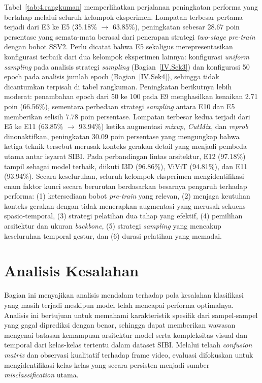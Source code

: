 Tabel~\ref{tab:4.rangkuman} memperlihatkan perjalanan peningkatan performa yang bertahap melalui seluruh kelompok eksperimen. Lompatan terbesar pertama terjadi dari E3 ke E5 (35.18\% $\rightarrow$ 63.85\%), peningkatan sebesar 28.67 poin persentase yang semata-mata berasal dari penerapan strategi \textit{two-stage pre-train} dengan bobot SSV2. Perlu dicatat bahwa E5 sekaligus merepresentasikan konfigurasi terbaik dari dua kelompok eksperimen lainnya: konfigurasi \textit{uniform sampling} pada analisis strategi \textit{sampling} (Bagian~\ref{IV.Sek3}) dan konfigurasi 50 epoch pada analisis jumlah epoch (Bagian~\ref{IV.Sek4}), sehingga tidak dicantumkan terpisah di tabel rangkuman. Peningkatan berikutnya lebih moderat: penambahan epoch dari 50 ke 100 pada E9 menghasilkan kenaikan 2.71 poin (66.56\%), sementara perbedaan strategi \textit{sampling} antara E10 dan E5 memberikan selisih 7.78 poin persentase. Lompatan terbesar kedua terjadi dari E5 ke E11 (63.85\% $\rightarrow$ 93.94\%) ketika augmentasi \textit{mixup}, \textit{CutMix}, dan \textit{reprob} dinonaktifkan, peningkatan 30.09 poin persentase yang mengungkap bahwa ketiga teknik tersebut merusak konteks gerakan detail yang menjadi pembeda utama antar isyarat SIBI. Pada perbandingan lintas arsitektur, E12 (97.18\%) tampil sebagai model terbaik, diikuti I3D (96.86\%), ViViT (94.81\%), dan E11 (93.94\%). Secara keseluruhan, seluruh kelompok eksperimen mengidentifikasi enam faktor kunci secara berurutan berdasarkan besarnya pengaruh terhadap performa: (1) ketersediaan bobot \textit{pre-train} yang relevan, (2) menjaga keutuhan konteks gerakan dengan tidak menerapkan augmentasi yang merusak sekuens spasio-temporal, (3) strategi pelatihan dua tahap yang efektif, (4) pemilihan arsitektur dan ukuran \textit{backbone}, (5) strategi \textit{sampling} yang mencakup keseluruhan temporal gestur, dan (6) durasi pelatihan yang memadai.\par


\section{Analisis Kesalahan} \label{IV.AnalisisKesalahan}

Bagian ini menyajikan analisis mendalam terhadap pola kesalahan klasifikasi yang masih terjadi meskipun model telah mencapai performa optimalnya. Analisis ini bertujuan untuk memahami karakteristik spesifik dari sampel-sampel yang gagal diprediksi dengan benar, sehingga dapat memberikan wawasan mengenai batasan kemampuan arsitektur model serta kompleksitas visual dan temporal dari kelas-kelas tertentu dalam dataset SIBI. Melalui telaah \textit{confusion matrix} dan observasi kualitatif terhadap frame video, evaluasi difokuskan untuk mengidentifikasi kelas-kelas yang secara persisten menjadi sumber \textit{misclassification} utama.\par

